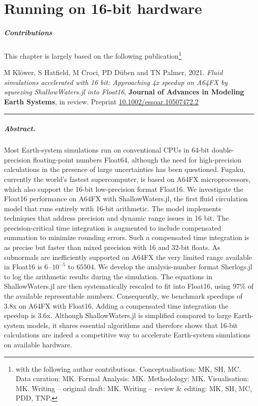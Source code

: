 \chapter{Running on 16-bit hardware}
\label{chap:hardware}

\small
\paragraph{Contributions} This chapter is largely based on the following publication\footnote{with the following author contributions.
Conceptualisation: MK, SH, MC. Data curation: MK. Formal Analysis: MK. Methodology: MK. Visualisation: MK. Writing – original draft:
MK. Writing – review \& editing: MK, SH, MC, PDD, TNP.}

\vspace{\baselineskip}
\indent M Klöwer, S Hatfield, M Croci, PD Düben and TN Palmer, 2021. \emph{Fluid simulations accelerated with 16 bit:
Approaching 4x speedup on A64FX by squeezing ShallowWaters.jl into Float16}, \textbf{Journal of Advances in Modeling
Earth Systems}, in review. Preprint \href{https://doi.org/10.1002/essoar.10507472.2}{10.1002/essoar.10507472.2}
\vspace{\baselineskip}
\hrule
\vspace{\baselineskip}
\normalsize

\paragraph{Abstract.} Most Earth-system simulations run on conventional CPUs in 64-bit double-precision floating-point numbers
Float64, although the need for high-precision calculations in the presence of large uncertainties has been questioned. Fugaku,
currently the world’s fastest supercomputer, is based on A64FX microprocessors, which also support the 16-bit low-precision format
Float16. We investigate the Float16 performance on A64FX with ShallowWaters.jl, the first fluid circulation model that runs entirely
with 16-bit arithmetic. The model implements techniques that address precision and dynamic range issues in 16 bit. The precision-critical
time integration is augmented to include compensated summation to minimize rounding errors. Such a compensated time integration is
as precise but faster than mixed precision with 16 and 32-bit floats. As subnormals are inefficiently supported on A64FX the very
limited range available in Float16 is $6 \cdot 10^{-5}$ to $65504$. We develop the analysis-number format Sherlogs.jl to log the arithmetic results
during the simulation. The equations in ShallowWaters.jl are then systematically rescaled to fit into Float16, using 97\% of the available
representable numbers. Consequently, we benchmark speedups of 3.8x on A64FX with Float16. Adding a compensated time integration
the speedup is 3.6x. Although ShallowWaters.jl is simplified compared to large Earth-system models, it shares essential algorithms and
therefore shows that 16-bit calculations are indeed a competitive way to accelerate Earth-system simulations on available hardware.


